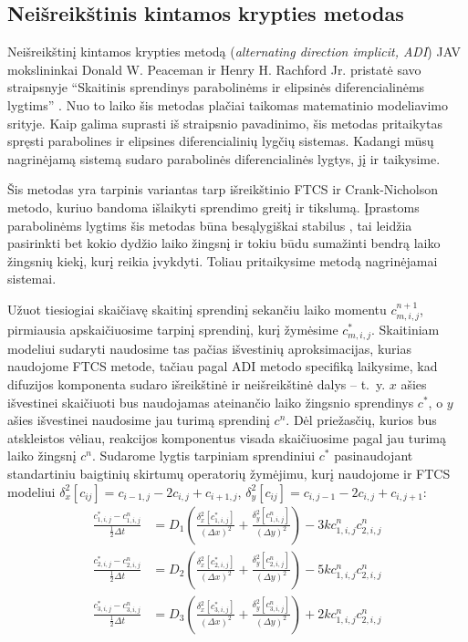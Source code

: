 \newpage
\subsection{Neišreikštinis kintamos krypties metodas}

Neišreikštinį kintamos krypties metodą (\textit{alternating direction implicit, ADI}) JAV mokslininkai Donald W. Peaceman ir Henry H. Rachford Jr. pristatė savo straipsnyje \enquote{Skaitinis sprendinys parabolinėms ir elipsinės diferencialinėms lygtims} \cite{doi:10.1137/0103003}. Nuo to laiko šis metodas plačiai taikomas matematinio modeliavimo srityje. Kaip galima suprasti iš straipsnio pavadinimo, šis metodas pritaikytas spręsti parabolines ir elipsines diferencialinių lygčių sistemas. Kadangi mūsų nagrinėjamą sistemą sudaro parabolinės diferencialinės lygtys, jį ir taikysime.

Šis metodas yra tarpinis variantas tarp išreikštinio FTCS ir Crank-Nicholson metodo, kuriuo bandoma išlaikyti sprendimo greitį ir tikslumą. Įprastoms parabolinėms lygtims šis metodas būna besąlygiškai stabilus \cite{liAlternatingDirectionImplicit2021}, tai leidžia pasirinkti bet kokio dydžio laiko žingsnį ir tokiu būdu sumažinti bendrą laiko žingsnių kiekį, kurį reikia įvykdyti. Toliau pritaikysime metodą nagrinėjamai sistemai.

Užuot tiesiogiai skaičiavę skaitinį sprendinį sekančiu laiko momentu $c^{n+1}_{m,i,j}$, pirmiausia apskaičiuosime tarpinį sprendinį, kurį žymėsime $c^*_{m,i,j}$. Skaitiniam modeliui sudaryti naudosime tas pačias išvestinių aproksimacijas, kurias naudojome FTCS metode, tačiau pagal ADI metodo specifiką laikysime, kad difuzijos komponenta sudaro išreikštinė ir neišreikštinė dalys -- \hbox{t. y.} $x$ ašies išvestinei skaičiuoti bus naudojamas ateinančio laiko žingsnio sprendinys $c^*$, o $y$ ašies išvestinei naudosime jau turimą sprendinį $c^n$. Dėl priežasčių, kurios bus atskleistos vėliau, reakcijos komponentus visada skaičiuosime pagal jau turimą laiko žingsnį $c^n$. Sudarome lygtis tarpiniam sprendiniui $c^*$ pasinaudojant standartiniu baigtinių skirtumų operatorių žymėjimu, kurį naudojome ir FTCS modeliui $\delta_x^2[c_{ij}]=c_{i-1,j}-2c_{i,j}+c_{i+1,j}$, $\delta_y^2[c_{ij}]=c_{i,j-1}-2c_{i,j}+c_{i,j+1}$:
\begin{subequations} \label{eqs:adi-half-step}
\begin{align}
	\frac{c^*_{1,i,j} - c^n_{1,i,j}}{\frac{1}{2}\Delta t} &= D_1 \left( \frac{\delta_x^2[c^*_{1,i,j}]}{(\Delta x)^2} + \frac{\delta_y^2[c^n_{1,i,j}]}{(\Delta y)^2} \right) - 3kc^n_{1,i,j}c^n_{2,i,j}\\
	\frac{c^*_{2,i,j} - c^n_{2,i,j}}{\frac{1}{2}\Delta t} &= D_2 \left( \frac{\delta_x^2[c^*_{2,i,j}]}{(\Delta x)^2} + \frac{\delta_y^2[c^n_{2,i,j}]}{(\Delta y)^2} \right) - 5kc^n_{1,i,j}c^n_{2,i,j}\\
	\frac{c^*_{3,i,j} - c^n_{3,i,j}}{\frac{1}{2}\Delta t} &= D_3 \left( \frac{\delta_x^2[c^*_{3,i,j}]}{(\Delta x)^2} + \frac{\delta_y^2[c^n_{3,i,j}]}{(\Delta y)^2} \right) +2kc^n_{1,i,j}c^n_{2,i,j}
\end{align}
\end{subequations}

